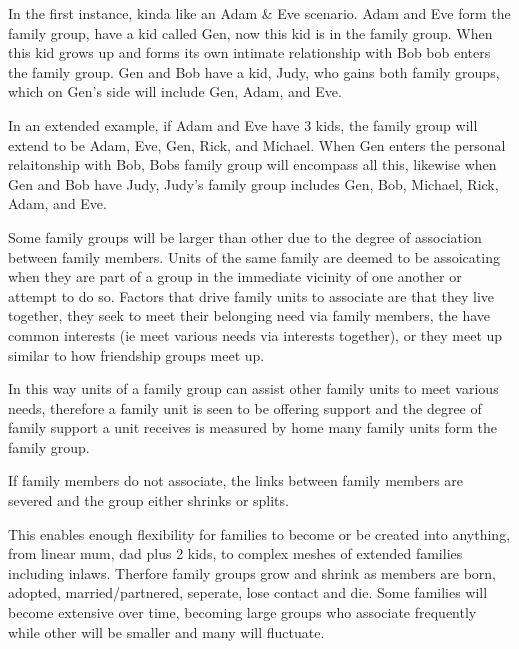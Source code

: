 In the first instance, kinda like an Adam & Eve scenario. Adam and Eve form the family group, have a kid called Gen, now this kid is in the family group. When this kid grows up and forms its own intimate relationship with Bob bob enters the family group. Gen and Bob have a kid, Judy, who gains both family groups, which on Gen's side will include Gen, Adam, and Eve.

In an extended example, if Adam and Eve have 3 kids, the family group will extend to be Adam, Eve, Gen, Rick, and Michael. When Gen enters the personal relaitonship with Bob, Bobs family group will encompass all this, likewise when Gen and Bob have Judy, Judy's family group includes Gen, Bob, Michael, Rick, Adam, and Eve.   

Some family groups will be larger than other due to the degree of association between family members. Units of the same family are deemed to be assoicating when they are part of a group in the immediate vicinity of one another or attempt to do so. Factors that drive family units to associate are that they live together, they seek to meet their belonging need via family members, the have common interests (ie meet various needs via interests together), or they meet up similar to how friendship groups meet up. 

In this way units of a family group can assist other family units to meet various needs, therefore a family unit is seen to be offering support and the degree of family support a unit receives is measured by home many family units form the family group. 

If family members do not associate, the links between family members are severed and the group either shrinks or splits.



This enables enough flexibility for families to become or be created into anything, from linear mum, dad plus 2 kids, to complex meshes of extended families including inlaws. Therfore family groups grow and shrink as members are born, adopted, married/partnered, seperate, lose contact and die. Some families will become extensive over time, becoming large groups who associate frequently while other will be smaller and many will fluctuate.

